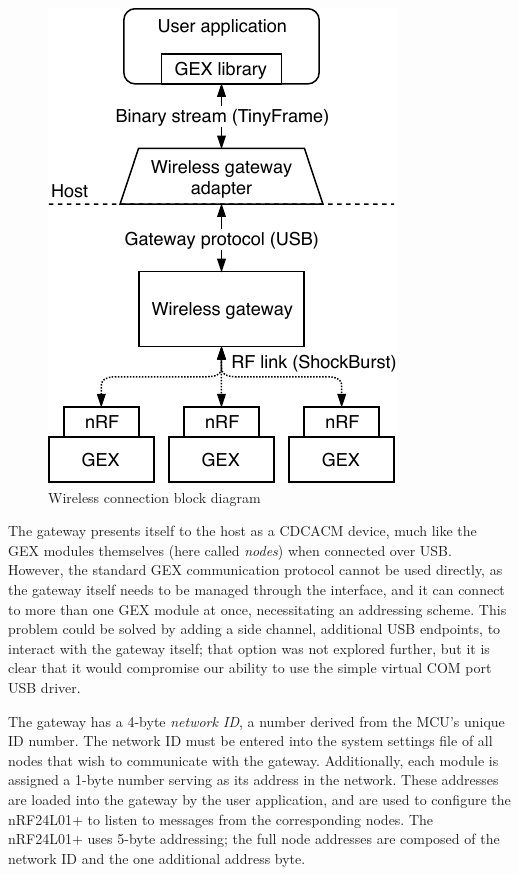 \begin{figure}
	\vspace{-1em}
	\centering
	\includegraphics[scale=0.9]{img/rf-gw.pdf}
	\caption{Wireless connection block diagram}
\end{figure}

The gateway presents itself to the host as a \gls{CDCACM} device, much like the GEX modules themselves (here called \textit{nodes}) when connected over \gls{USB}. However, the standard GEX communication protocol cannot be used directly, as the gateway itself needs to be managed through the interface, and it can connect to more than one GEX module at once, necessitating an addressing scheme. This problem could be solved by adding a side channel, additional \gls{USB} endpoints, to interact with the gateway itself; that option was not explored further, but it is clear that it would compromise our ability to use the simple virtual COM port \gls{USB} driver. 


The gateway has a 4-byte \textit{network ID}, a number derived from the \gls{MCU}'s unique ID number. The network ID must be entered into the system settings file of all nodes that wish to communicate with the gateway. Additionally, each module is assigned a 1-byte number serving as its address in the network. These addresses are loaded into the gateway by the user application, and are used to configure the nRF24L01+ to listen to messages from the corresponding nodes. The nRF24L01+ uses 5-byte addressing; the full node addresses are composed of the network ID and the one additional address byte.

